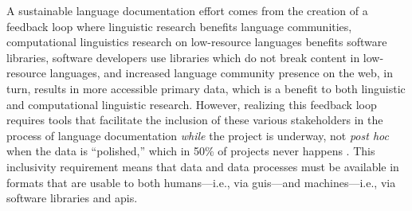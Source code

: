 \documentclass[11pt]{article}
\newcommand{\smalltodo}[2][]
    {\todo[caption={#2}, #1]
    {\tiny#2\normalsize}}
\begin{document}
A sustainable language documentation effort comes from the creation of a
feedback loop where linguistic research benefits language communities,
computational linguistics research on low-resource languages benefits software
libraries, software developers use libraries which do not break content in
low-resource languages,
and increased language community presence on the web, in turn, results in more
accessible primary data, which is a benefit to both linguistic and computational
linguistic research.
However, realizing this feedback loop requires tools that facilitate
the inclusion of these various stakeholders in the process of language documentation
\emph{while} the project is underway, not \emph{post hoc} when the data is ``polished,''
which in 50\% of projects never happens \cite{Thieberger:2012}. This
inclusivity requirement means that data and data processes must be available in
formats that are usable to both humans---i.e., via \glspl{gui}---and machines---i.e.,
via software libraries and \glspl{api}.
\end{document}
